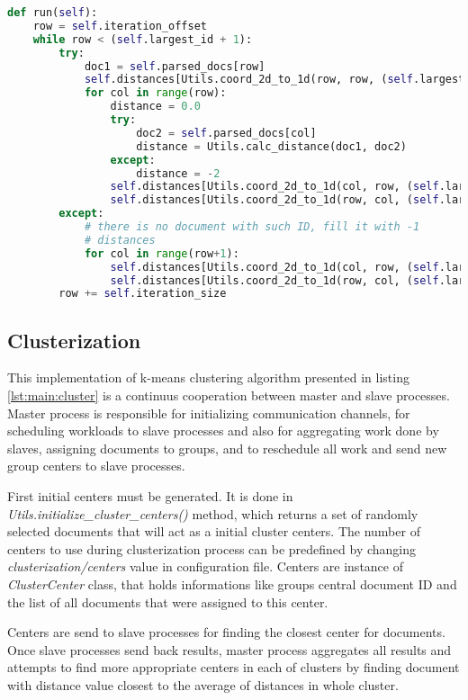 \begin{lstlisting}[language=Python, caption={Distance.run() - Distance class process main method}, label={lst:distance:run}]
def run(self):
    row = self.iteration_offset
    while row < (self.largest_id + 1):
        try:
            doc1 = self.parsed_docs[row]
            self.distances[Utils.coord_2d_to_1d(row, row, (self.largest_id + 1))] = 1.0
            for col in range(row):
                distance = 0.0
                try:
                    doc2 = self.parsed_docs[col]
                    distance = Utils.calc_distance(doc1, doc2)
                except:
                    distance = -2
                self.distances[Utils.coord_2d_to_1d(col, row, (self.largest_id + 1))] = distance
                self.distances[Utils.coord_2d_to_1d(row, col, (self.largest_id + 1))] = distance
        except:
            # there is no document with such ID, fill it with -1
            # distances
            for col in range(row+1):
                self.distances[Utils.coord_2d_to_1d(col, row, (self.largest_id + 1))] = -1
                self.distances[Utils.coord_2d_to_1d(row, col, (self.largest_id + 1))] = -1
        row += self.iteration_size
\end{lstlisting}

\subsection{Clusterization}

This implementation of k-means clustering algorithm presented in listing \ref{lst:main:cluster} is a continuus cooperation between master and slave processes. Master process is responsible for initializing communication channels, for scheduling workloads to slave processes and also for aggregating work done by slaves, assigning documents to groups, and to reschedule all work and send new group centers to slave processes.

First initial centers must be generated. It is done in \textit{Utils.initialize\_cluster\_centers()} method, which returns a set of randomly selected documents that will act as a initial cluster centers. The number of centers to use during clusterization process can be predefined by changing \textit{clusterization/centers} value in configuration file. Centers are instance of \textit{ClusterCenter} class, that holds informations like groups central document ID and the list of all documents that were assigned to this center.

Centers are send to slave processes for finding the closest center for documents. Once slave processes send back results, master process aggregates all results and attempts to find more appropriate centers in each of clusters by finding document with distance value closest to the average of distances in whole cluster. 

